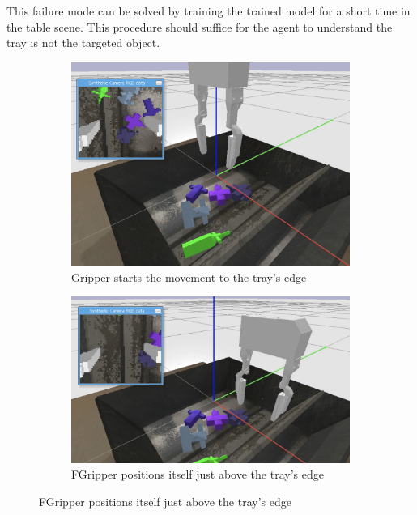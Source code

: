 \begin{enumerate}
    This failure mode can be solved by training the trained model for a short time in the table scene. This procedure should suffice for the agent to understand the tray is not the targeted object.
    \begin{figure}[!htbp]
        \begin{subfigure}{0.33\textwidth}
            \includegraphics[width=\linewidth]{figures/failure/trayedge1}
            \caption{Gripper starts the movement to the tray's edge} \label{fig:table}
        \end{subfigure}%
        \hspace*{\fill}   %
        \begin{subfigure}{0.35\textwidth}
            \includegraphics[width=\linewidth]{figures/failure/trayedge2}
            \caption{FGripper positions itself just above the tray's edge} \label{fig:floor}

\end{subfigure}
\end{figure}
\end{enumerate}
